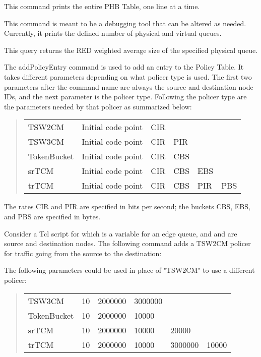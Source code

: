 This command prints the entire PHB Table, one line at a time.


This command is meant to be a debugging tool that can be altered as needed.  
Currently, it prints the defined number of physical and virtual queues.


This query returns the RED weighted average size of the specified physical 
queue.

The addPolicyEntry command is used to add an entry to the Policy Table.  
It takes different parameters depending on what policer type is used.  
The first two parameters after the command name are always the source and 
destination node IDs, and the next parameter is the policer type. 
Following the policer type are the parameters needed by that policer as 
summarized below:

\begin{quote}
\begin{tabular}{llllll}
TSW2CM&{Initial code point}&CIR\\
TSW3CM&{Initial code point}&CIR&PIR\\
TokenBucket&{Initial code point}&CIR&CBS\\
srTCM&{Initial code point}&CIR&CBS&EBS\\
trTCM&{Initial code point}&CIR&CBS&PIR&PBS
\end{tabular}
\end{quote}

The rates CIR and PIR are specified in bits per second; 
the buckets CBS, EBS, and PBS are specified in bytes.
 
Consider a Tcl script for which  is a variable for an edge queue, 
and  and  are source and destination nodes.   
The following command adds a TSW2CM policer for traffic going from the 
source to the destination:


The following parameters could be used in place of "TSW2CM" to use a 
different policer:
\begin{quote}
\begin{tabular}{llllll}
TSW3CM&10&2000000&3000000\\
TokenBucket&10&2000000&10000\\
srTCM&10&2000000&10000&20000\\
trTCM&10&2000000&10000&3000000&10000
\end{tabular}
\end{quote}

